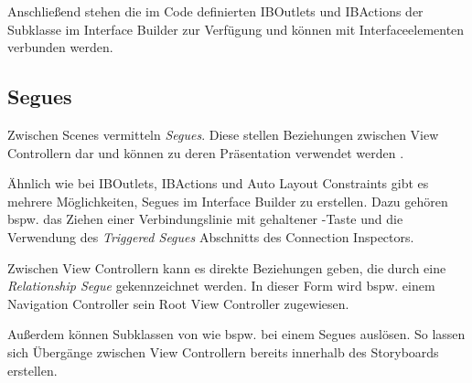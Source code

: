 \documentclass[parskip=half, final]{scrreprt}
\begin{document}

Anschließend stehen die im Code definierten IBOutlets und IBActions der  Subklasse im Interface Builder zur Verfügung und können mit Interfaceelementen verbunden werden.

\subsection{Segues}

Zwischen Scenes vermitteln \emph{Segues}. Diese stellen Beziehungen zwischen View Controllern dar und können zu deren Präsentation verwendet werden .


Ähnlich wie bei IBOutlets, IBActions und Auto Layout Constraints gibt es mehrere Möglichkeiten, Segues im Interface Builder zu erstellen. Dazu gehören bspw. das Ziehen einer Verbindungslinie mit gehaltener \keys{\ctrl}-Taste und die Verwendung des \emph{Triggered Segues} Abschnitts des Connection Inspectors.

Zwischen View Controllern kann es direkte Beziehungen geben, die durch eine \emph{Relationship Segue} gekennzeichnet werden. In dieser Form wird bspw. einem Navigation Controller sein Root View Controller zugewiesen.

Außerdem können Subklassen von  wie bspw.  bei einem  Segues auslösen. So lassen sich Übergänge zwischen View Controllern bereits innerhalb des Storyboards erstellen.
\end{document}
